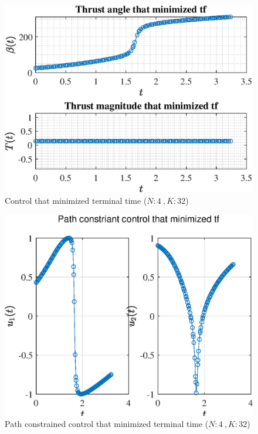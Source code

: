 \documentclass[]{article}
\begin{document}
	\begin{figure}
		\centering
		\includegraphics[scale=0.75]{control_N4_K32_C3_tf.eps}
		\caption{Control that minimized terminal time (\(N:4\ , K:32\))}
		\label{fig:control_N4_K32_C3_tf}
	\end{figure}
	\begin{figure}
		\centering
		\includegraphics[scale=0.75]{path_N4_K32_C3_tf.eps}
		\caption{Path constrained control that minimized terminal time (\(N:4\ , K:32\))}
		\label{fig:path_N4_K32_C3_tf}
	\end{figure}
\end{document}
